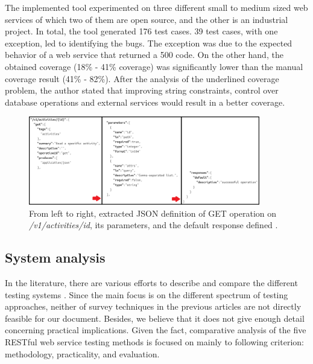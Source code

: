 \documentclass[english]{tktltiki}
\begin{document}
The implemented tool experimented on three different small to medium sized web services of which two of them are open source, and the other is an industrial project. In total, the tool generated 176 test cases. 39 test cases, with one exception, led to identifying the bugs. The exception was due to the expected behavior of a web service that returned a 500 code. On the other hand, the obtained coverage (18\% - 41\% coverage) was significantly lower than the manual coverage result (41\% - 82\%). After the analysis of the underlined coverage problem, the author stated that improving string constraints, control over database operations and external services would result in a better coverage.
\begin{figure}[h]
	\begin{center}
		\includegraphics[width=0.9\textwidth]{images/swagger_c.png}
		\caption{From left to right, extracted JSON definition of GET operation on \textit{/v1/activities/{id}}, its parameters, and the default response defined \cite{arcuri2017restful}. }
		\label{fig:swagger}
	\end{center}
\end{figure}
\subsection{System analysis}
In the literature, there are various efforts to describe and compare the different testing systems \cite{canfora2006testing, canfora2009service, bozkurt2013testing}. Since the main focus is on the different spectrum of testing approaches, neither of survey techniques in the previous articles are not directly feasible for our document. Besides, we believe that it does not give enough detail concerning practical implications. Given the fact, comparative analysis of the five RESTful web service testing methods is focused on mainly to following criterion: methodology, practicality, and evaluation.
\end{document}

